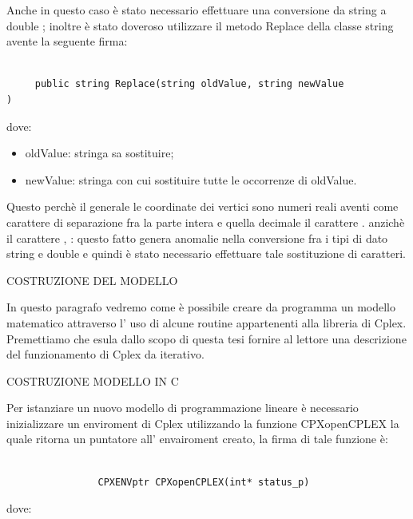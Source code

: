 \documentclass[11pt]{article}
\begin{document}
Anche in questo caso \`e stato necessario effettuare una conversione da string a double ; inoltre \`e stato doveroso utilizzare il metodo Replace della classe string avente la seguente firma:

\begin{lstlisting}

     public string Replace(string oldValue, string newValue
)

\end{lstlisting}
dove:
\begin{itemize}
	\item oldValue: stringa sa sostituire;
	\item newValue: stringa con cui sostituire tutte le occorrenze di oldValue.
\end{itemize}


Questo perch\`e il generale le coordinate dei vertici sono numeri reali aventi come carattere di separazione fra la parte intera e quella decimale il carattere . anzich\`e il carattere , : questo fatto genera anomalie nella conversione fra i tipi di dato string e double e quindi \`e  stato necessario effettuare tale sostituzione di caratteri.


\vspace{2\baselineskip}
COSTRUZIONE DEL MODELLO
\vspace{2\baselineskip}

In questo paragrafo vedremo come \`e possibile creare da programma un modello matematico attraverso l' uso di alcune routine appartenenti alla libreria di Cplex. Premettiamo che esula dallo scopo di questa tesi fornire al lettore una descrizione del funzionamento di Cplex da iterativo.


\vspace{2\baselineskip}
COSTRUZIONE MODELLO IN C
\vspace{2\baselineskip}

Per istanziare un nuovo modello di programmazione lineare \`e necessario inizializzare un enviroment di Cplex utilizzando la funzione CPXopenCPLEX la quale ritorna un puntatore all' envairoment creato, la firma di tale funzione \`e:


\begin{lstlisting}

                CPXENVptr CPXopenCPLEX(int* status_p)

\end{lstlisting}

dove:
\end{document}
